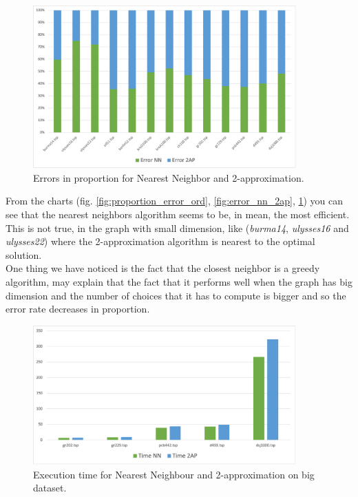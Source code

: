 \begin{figure}[H]
    \centering
    \includegraphics[width=0.9\textwidth]{./img/error_nn_2ap_prop.png}
    \caption{Errors in proportion for Nearest Neighbor and 2-approximation.}
    \label{fig:error_nn_2ap_prop}
\end{figure}
From the charts (fig. \ref{fig:proportion_error_ord}, \ref{fig:error_nn_2ap}, \ref{fig:error_nn_2ap_prop}) you can see that the nearest neighbors algorithm seems to be, in mean, the most efficient. This is not true, in the graph with small dimension, like (\textit{burma14}, \textit{ulysses16} and \textit{ulysses22}) where the 2-approximation algorithm is nearest to the optimal solution.\\
One thing we have noticed is the fact that the closest neighbor is a greedy algorithm, may explain that the fact that it performs well when the graph has big dimension and the number of choices that it has to compute is bigger and so the error rate decreases in proportion.

\begin{figure}[H]
    \centering
    \includegraphics[width=0.9\textwidth]{./img/time_nn_2ap_big.png}
    \caption{Execution time for Nearest Neighbour and 2-approximation on big dataset.}
    \label{fig:time_nn_2ap_big}
\end{figure}

